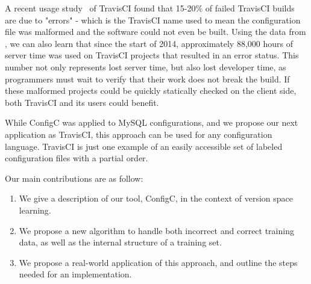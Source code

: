 A recent usage study~\cite{API} of TravisCI found that 15-20\% of failed TravisCI builds are due to "errors" - which is the TravisCI name used to mean the configuration file was malformed and the software could not even be built.
Using the data from \cite{API}, we can also learn that since the start of 2014, approximately 88,000 hours of server time was used on TravisCI projects that resulted in an error status.
This number not only represents lost server time, but also lost developer time, as programmers must wait to verify that their work does not break the build.
If these malformed projects could be quickly statically checked on the client side, both TravisCI and its users could benefit.

While ConfigC was applied to MySQL configurations, and we propose our next application as TravisCI, this approach can be used for any configuration language.
TravisCI is just one example of an easily accessible set of labeled configuration files with a partial order.

Our main contributions are as follow:

\begin{enumerate}

\item We give a description of our tool, ConfigC, in the context of version space learning.
\item We propose a new algorithm to handle both incorrect and correct training data, as well as the internal structure of a training set.
\item We propose a real-world application of this approach, and outline the steps needed for an implementation.

\end{enumerate} 
